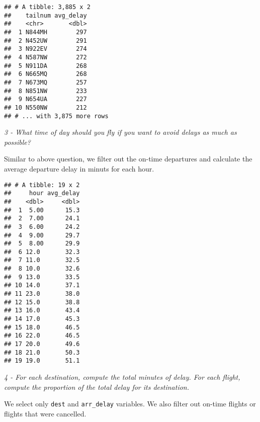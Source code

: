 \documentclass[]{article}
\newenvironment{Shaded}{\begin{snugshade}}{\end{snugshade}}
\newcommand{\KeywordTok}[1]{\textcolor[rgb]{0.13,0.29,0.53}{\textbf{#1}}}
\newcommand{\DataTypeTok}[1]{\textcolor[rgb]{0.13,0.29,0.53}{#1}}
\newcommand{\DecValTok}[1]{\textcolor[rgb]{0.00,0.00,0.81}{#1}}
\newcommand{\StringTok}[1]{\textcolor[rgb]{0.31,0.60,0.02}{#1}}
\newcommand{\OtherTok}[1]{\textcolor[rgb]{0.56,0.35,0.01}{#1}}
\newcommand{\OperatorTok}[1]{\textcolor[rgb]{0.81,0.36,0.00}{\textbf{#1}}}
\newcommand{\NormalTok}[1]{#1}
\theoremstyle{definition}
\theoremstyle{definition}
\theoremstyle{definition}
\theoremstyle{remark}
\begin{document}
\begin{verbatim}
## # A tibble: 3,885 x 2
##    tailnum avg_delay
##    <chr>       <dbl>
##  1 N844MH        297
##  2 N452UW        291
##  3 N922EV        274
##  4 N587NW        272
##  5 N911DA        268
##  6 N665MQ        268
##  7 N673MQ        257
##  8 N851NW        233
##  9 N654UA        227
## 10 N550NW        212
## # ... with 3,875 more rows
\end{verbatim}

\emph{3 - What time of day should you fly if you want to avoid delays as
much as possible?}

Similar to above question, we filter out the on-time departures and
calculate the average departure delay in minuts for each hour.

\begin{Shaded}
\end{Shaded}

\begin{verbatim}
## # A tibble: 19 x 2
##     hour avg_delay
##    <dbl>     <dbl>
##  1  5.00      15.3
##  2  7.00      24.1
##  3  6.00      24.2
##  4  9.00      29.7
##  5  8.00      29.9
##  6 12.0       32.3
##  7 11.0       32.5
##  8 10.0       32.6
##  9 13.0       33.5
## 10 14.0       37.1
## 11 23.0       38.0
## 12 15.0       38.8
## 13 16.0       43.4
## 14 17.0       45.3
## 15 18.0       46.5
## 16 22.0       46.5
## 17 20.0       49.6
## 18 21.0       50.3
## 19 19.0       51.1
\end{verbatim}

\emph{4 - For each destination, compute the total minutes of delay. For
each flight, compute the proportion of the total delay for its
destination.}

We select only \texttt{dest} and \texttt{arr\_delay} variables. We also
filter out on-time flights or flights that were cancelled.

\begin{Shaded}
\end{Shaded}
\end{document}
